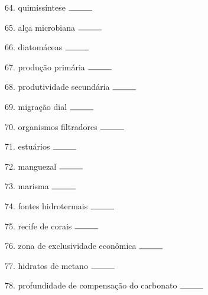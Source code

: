 \documentclass[a4paper,10pt]{article}
\begin{document}
\begin{multicols}{2}
64. quimissíntese $\rule{1cm}{0.15mm}$

65. alça microbiana $\rule{1cm}{0.15mm}$

66. diatomáceas $\rule{1cm}{0.15mm}$

67. produção primária $\rule{1cm}{0.15mm}$

68. produtividade secundária $\rule{1cm}{0.15mm}$

69. migração dial $\rule{1cm}{0.15mm}$

70. organismos filtradores $\rule{1cm}{0.15mm}$

71. estuários $\rule{1cm}{0.15mm}$

72. manguezal $\rule{1cm}{0.15mm}$

73. marisma $\rule{1cm}{0.15mm}$

74. fontes hidrotermais $\rule{1cm}{0.15mm}$

75. recife de corais $\rule{1cm}{0.15mm}$

76. zona de exclusividade econômica $\rule{1cm}{0.15mm}$

77. hidratos de metano $\rule{1cm}{0.15mm}$

78. profundidade de compensação do carbonato $\rule{1cm}{0.15mm}$

 
\end{multicols}



  
 

\end{document}
